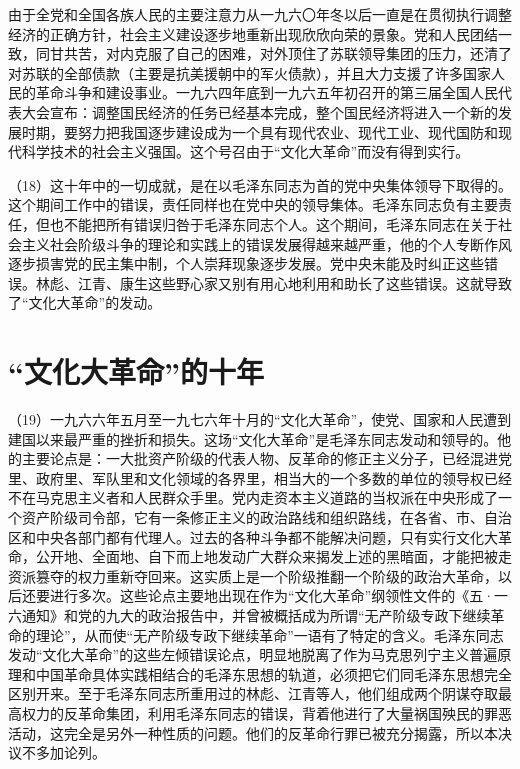 由于全党和全国各族人民的主要注意力从一九六〇年冬以后一直是在贯彻执行调整经济的正确方针，社会主义建设逐步地重新出现欣欣向荣的景象。党和人民团结一致，同甘共苦，对内克服了自己的困难，对外顶住了苏联领导集团的压力，还清了对苏联的全部债款（主要是抗美援朝中的军火债款），并且大力支援了许多国家人民的革命斗争和建设事业。一九六四年底到一九六五年初召开的第三届全国人民代表大会宣布：调整国民经济的任务已经基本完成，整个国民经济将进入一个新的发展时期，要努力把我国逐步建设成为一个具有现代农业、现代工业、现代国防和现代科学技术的社会主义强国。这个号召由于“文化大革命”而没有得到实行。

（18）这十年中的一切成就，是在以毛泽东同志为首的党中央集体领导下取得的。这个期间工作中的错误，责任同样也在党中央的领导集体。毛泽东同志负有主要责任，但也不能把所有错误归咎于毛泽东同志个人。这个期间，毛泽东同志在关于社会主义社会阶级斗争的理论和实践上的错误发展得越来越严重，他的个人专断作风逐步损害党的民主集中制，个人崇拜现象逐步发展。党中央未能及时纠正这些错误。林彪、江青、康生这些野心家又别有用心地利用和助长了这些错误。这就导致了“文化大革命”的发动。

\section{“文化大革命”的十年}

（19）一九六六年五月至一九七六年十月的“文化大革命”，使党、国家和人民遭到建国以来最严重的挫折和损失。这场“文化大革命”是毛泽东同志发动和领导的。他的主要论点是：一大批资产阶级的代表人物、反革命的修正主义分子，已经混进党里、政府里、军队里和文化领域的各界里，相当大的一个多数的单位的领导权已经不在马克思主义者和人民群众手里。党内走资本主义道路的当权派在中央形成了一个资产阶级司令部，它有一条修正主义的政治路线和组织路线，在各省、市、自治区和中央各部门都有代理人。过去的各种斗争都不能解决问题，只有实行文化大革命，公开地、全面地、自下而上地发动广大群众来揭发上述的黑暗面，才能把被走资派篡夺的权力重新夺回来。这实质上是一个阶级推翻一个阶级的政治大革命，以后还要进行多次。这些论点主要地出现在作为“文化大革命”纲领性文件的《五·一六通知》和党的九大的政治报告中，并曾被概括成为所谓“无产阶级专政下继续革命的理论”，从而使“无产阶级专政下继续革命”一语有了特定的含义。毛泽东同志发动“文化大革命”的这些左倾错误论点，明显地脱离了作为马克思列宁主义普遍原理和中国革命具体实践相结合的毛泽东思想的轨道，必须把它们同毛泽东思想完全区别开来。至于毛泽东同志所重用过的林彪、江青等人，他们组成两个阴谋夺取最高权力的反革命集团，利用毛泽东同志的错误，背着他进行了大量祸国殃民的罪恶活动，这完全是另外一种性质的问题。他们的反革命行罪已被充分揭露，所以本决议不多加论列。

